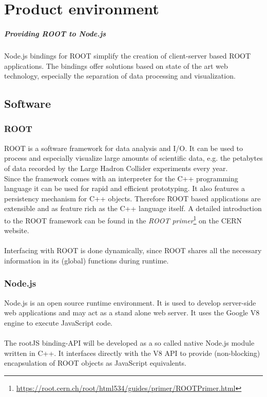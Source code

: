 \chapter{Product environment}

\paragraph{Providing ROOT to Node.js}
\noindent Node.js bindings for ROOT simplify the creation of client-server based ROOT applications. The bindings offer solutions based on state of the art web technology, especially the separation of data processing and visualization.\\

\section{Software}
\subsection{ROOT}

ROOT is a software framework for data analysis and I/O. It can be used to process and especially visualize large amounts of scientific data, e.g. the petabytes of data recorded by the Large Hadron Collider experiments every year.\\
Since the framework comes with an interpreter for the C++ programming language it can be used for rapid and efficient prototyping. It also features a persistency mechanism for C++ objects. Therefore ROOT based applications are extensible and as feature rich as the C++ language itself.
A detailed introduction to the ROOT framework can be found in the \textit{ROOT  primer}\footnote[1]{\url{https://root.cern.ch/root/html534/guides/primer/ROOTPrimer.html}}
on the CERN website. \\ \\
Interfacing with ROOT is done dynamically, since ROOT shares all the necessary information in its (global) functions during runtime.

\subsection{Node.js}

Node.js is an open source runtime environment. It is used to develop server-side web applications and may act as a stand alone web server. It uses the Google V8 engine to execute JavaScript code. \\ \\
The rootJS binding-API will be developed as a so called native Node.js module written in C++. It interfaces directly with the V8 API to provide (non-blocking) encapsulation of ROOT objects as JavaScript equivalents.

